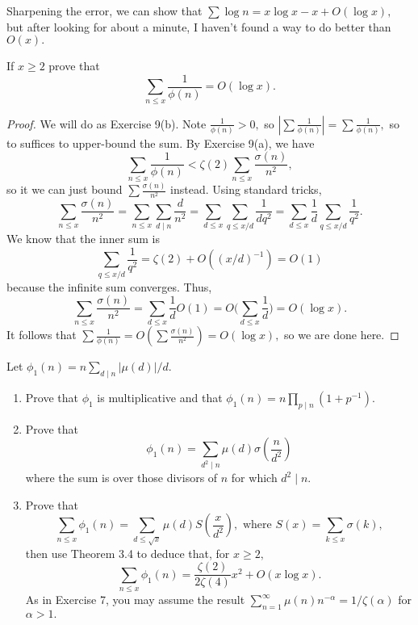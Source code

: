 Sharpening the error, we can show that $\sum\log n=x\log x-x+O(\log x),$ but after looking for about a minute, I haven't found a way to do better than $O(x).$

\begin{exercise}
If $x\ge2$ prove that
\[\sum_{n\le x}\frac1{\phi(n)}=O(\log x).\]
\end{exercise}

\begin{proof}
We will do as Exercise 9(b). Note $\frac1{\phi(n)}>0,$ so $\left|\sum\frac1{\phi(n)}\right|=\sum\frac1{\phi(n)},$ so to suffices to upper-bound the sum. By Exercise 9(a), we have
\[\sum_{n\le x}\frac1{\phi(n)}<\zeta(2)\sum_{n\le x}\frac{\sigma(n)}{n^2},\]
so it we can just bound $\sum\frac{\sigma(n)}{n^2}$ instead. Using standard tricks,
\[\sum_{n\le x}\frac{\sigma(n)}{n^2}=\sum_{n\le x}\sum_{d\mid n}\frac d{n^2}=\sum_{d\le x}\sum_{q\le x/d}\frac1{dq^2}=\sum_{d\le x}\frac1d\sum_{q\le x/d}\frac1{q^2}.\]
We know that the inner sum is
\[\sum_{q\le x/d}\frac1{q^2}=\zeta(2)+O\left((x/d)^{-1}\right)=O(1)\]
because the infinite sum converges. Thus,
\[\sum_{n\le x}\frac{\sigma(n)}{n^2}=\sum_{d\le x}\frac1dO(1)=O\Bigg(\sum_{d\le x}\frac1d\Bigg)=O(\log x).\]
It follows that $\sum\frac1{\phi(n)}=O\left(\sum\frac{\sigma(n)}{n^2}\right)=O(\log x),$ so we are done here.
\end{proof}

\begin{exercise}
Let $\phi_1(n)=n\sum_{d\mid n}|\mu(d)|/d.$
\begin{enumerate}[label=(\alph*)]
    \item Prove that $\phi_1$ is multiplicative and that $\phi_1(n)=n\prod_{p\mid n}\left(1+p^{-1}\right).$
    \item Prove that
    \[\phi_1(n)=\sum_{d^2\mid n}\mu(d)\sigma\left(\frac n{d^2}\right)\]
    where the sum is over those divisors of $n$ for which $d^2\mid n.$
    \item Prove that
    \[\sum_{n\le x}\phi_1(n)=\sum_{d\le\sqrt x}\mu(d)S\left(\frac x{d^2}\right),\text{ where }S(x)=\sum_{k\le x}\sigma(k),\]
    then use Theorem 3.4 to deduce that, for $x\ge2,$
    \[\sum_{n\le x}\phi_1(n)=\frac{\zeta(2)}{2\zeta(4)}x^2+O(x\log x).\]
    As in Exercise 7, you may assume the result $\sum_{n=1}^\infty\mu(n)n^{-\alpha}=1/\zeta(\alpha)$ for $\alpha>1.$
\end{enumerate}
\end{exercise}

